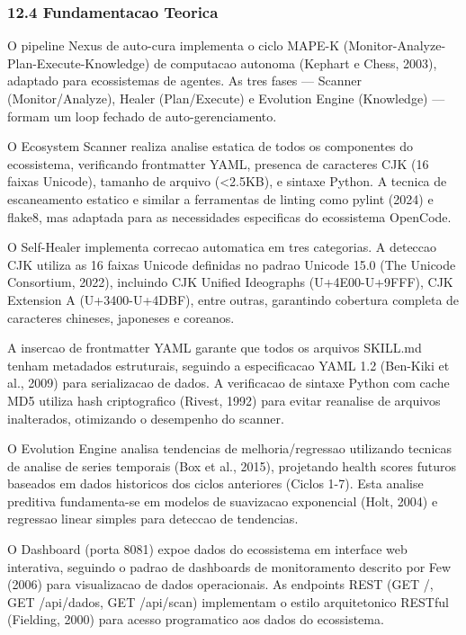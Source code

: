 \documentclass[
  12pt,
]{article}
\begin{document}
\subsubsection{12.4 Fundamentacao
Teorica}\label{fundamentacao-teorica-11}

O pipeline Nexus de auto-cura implementa o ciclo MAPE-K
(Monitor-Analyze-Plan-Execute-Knowledge) de computacao autonoma (Kephart
e Chess, 2003), adaptado para ecossistemas de agentes. As tres fases ---
Scanner (Monitor/Analyze), Healer (Plan/Execute) e Evolution Engine
(Knowledge) --- formam um loop fechado de auto-gerenciamento.

O Ecosystem Scanner realiza analise estatica de todos os componentes do
ecossistema, verificando frontmatter YAML, presenca de caracteres CJK
(16 faixas Unicode), tamanho de arquivo (\textless2.5KB), e sintaxe
Python. A tecnica de escaneamento estatico e similar a ferramentas de
linting como pylint (2024) e flake8, mas adaptada para as necessidades
especificas do ecossistema OpenCode.

O Self-Healer implementa correcao automatica em tres categorias. A
deteccao CJK utiliza as 16 faixas Unicode definidas no padrao Unicode
15.0 (The Unicode Consortium, 2022), incluindo CJK Unified Ideographs
(U+4E00-U+9FFF), CJK Extension A (U+3400-U+4DBF), entre outras,
garantindo cobertura completa de caracteres chineses, japoneses e
coreanos.

A insercao de frontmatter YAML garante que todos os arquivos SKILL.md
tenham metadados estruturais, seguindo a especificacao YAML 1.2
(Ben-Kiki et al., 2009) para serializacao de dados. A verificacao de
sintaxe Python com cache MD5 utiliza hash criptografico (Rivest, 1992)
para evitar reanalise de arquivos inalterados, otimizando o desempenho
do scanner.

O Evolution Engine analisa tendencias de melhoria/regressao utilizando
tecnicas de analise de series temporais (Box et al., 2015), projetando
health scores futuros baseados em dados historicos dos ciclos anteriores
(Ciclos 1-7). Esta analise preditiva fundamenta-se em modelos de
suavizacao exponencial (Holt, 2004) e regressao linear simples para
deteccao de tendencias.

O Dashboard (porta 8081) expoe dados do ecossistema em interface web
interativa, seguindo o padrao de dashboards de monitoramento descrito
por Few (2006) para visualizacao de dados operacionais. As endpoints
REST (GET /, GET /api/dados, GET /api/scan) implementam o estilo
arquitetonico RESTful (Fielding, 2000) para acesso programatico aos
dados do ecossistema.
\end{document}
